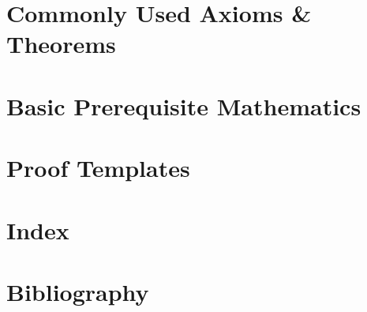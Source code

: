 \documentclass[11pt,fleqn,dvipsnames]{book} %
\begin{document}
\chapter*{Commonly Used Axioms \& Theorems}

\renewcommand{\leftmark}{\sffamily\bfseries Axioms \& Theorems}
\renewcommand{\rightmark}{\sffamily\bfseries Axioms \& Theorems}



\chapter*{Basic Prerequisite Mathematics}


\chapter*{Proof Templates}



\chapter*{Index}
\renewcommand{\leftmark}{\sffamily\bfseries Index}
\renewcommand{\rightmark}{\sffamily\bfseries Index}
\setlength{\columnsep}{0.75cm} %

\printindex %

\chapter*{Bibliography}
\renewcommand{\leftmark}{\sffamily\bfseries Bibliography}
\renewcommand{\rightmark}{\sffamily\bfseries Bibliography}
\end{document}
